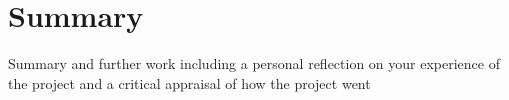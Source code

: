 \section{Summary}
{\color{red}Summary and further work including a personal reflection on your experience of the project and a critical appraisal of how the project went}